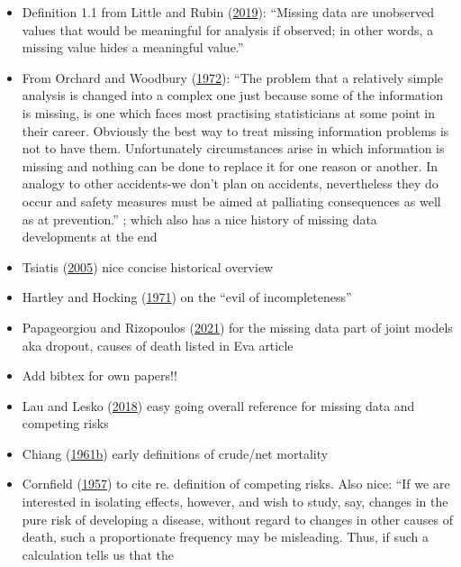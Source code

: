 \documentclass[
  letterpaper,
  DIV=11,
  numbers=noendperiod]{scrreprt}
\begin{document}
\begin{itemize}
\item
  Definition 1.1 from Little and Rubin
  (\protect\hyperlink{ref-littleStatisticalAnalysisMissing2019}{2019}):
  ``Missing data are unobserved values that would be meaningful for
  analysis if observed; in other words, a missing value hides a
  meaningful value.''
\item
  From Orchard and Woodbury
  (\protect\hyperlink{ref-orchard1972missing}{1972}): ``The problem that
  a relatively simple analysis is changed into a complex one just
  because some of the information is missing, is one which faces most
  practising statisticians at some point in their career. Obviously the
  best way to treat missing information problems is not to have them.
  Unfortunately circumstances arise in which information is missing and
  nothing can be done to replace it for one reason or another. In
  analogy to other accidents-we don't plan on accidents, nevertheless
  they do occur and safety measures must be aimed at palliating
  consequences as well as at prevention.'' ; which also has a nice
  history of missing data developments at the end
\item
  Tsiatis (\protect\hyperlink{ref-tsiatis2005encycl}{2005}) nice concise
  historical overview
\item
  Hartley and Hocking
  (\protect\hyperlink{ref-hartleyAnalysisIncompleteData1971}{1971}) on
  the ``evil of incompleteness''
\item
  Papageorgiou and Rizopoulos
  (\protect\hyperlink{ref-papageorgiouAlternativeCharacterizationMAR2021}{2021})
  for the missing data part of joint models aka dropout, causes of death
  listed in Eva article
\item
  Add bibtex for own papers!!
\item
  Lau and Lesko
  (\protect\hyperlink{ref-lauMissingnessSettingCompeting2018}{2018})
  easy going overall reference for missing data and competing risks
\item
  Chiang (\protect\hyperlink{ref-chiang1961probability}{1961b}) early
  definitions of crude/net mortality
\item
  Cornfield
  (\protect\hyperlink{ref-cornfieldEstimationProbabilityDeveloping1957}{1957})
  to cite re. definition of competing risks. Also nice: ``If we are
  interested in isolating effects, however, and wish to study, say,
  changes in the pure risk of developing a disease, without regard to
  changes in other causes of death, such a proportionate frequency may
  be misleading. Thus, if such a calculation tells us that the

\end{itemize}
\end{document}
